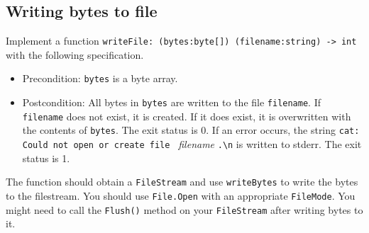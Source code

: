 \subsection*{Writing bytes to file}

Implement a function \texttt{writeFile: (bytes:byte[]) (filename:string) -> int} with the following specification. 
\begin{itemize}
\item Precondition: \texttt{bytes} is a byte array.
\item Postcondition: All bytes in \texttt{bytes} are written to the file \texttt{filename}. If \texttt{filename} does not exist, it is created. If it does exist, it is overwritten with the contents of \texttt{bytes}. The exit status is 0.
  If an error occurs, the string \verb|cat: Could not open or create file | \textit{filename} \verb|.\n| is written to stderr. The exit status is 1.
\end{itemize}

The function should obtain a \texttt{FileStream} and use \texttt{writeBytes} to write the bytes to the filestream. 
You should use \texttt{File.Open} with an appropriate \texttt{FileMode}. 
You might need to call the \texttt{Flush()} method on your \texttt{FileStream} after writing bytes to it. 
